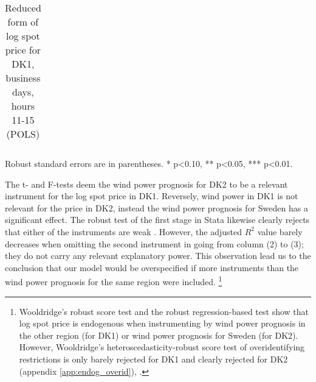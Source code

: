 \begin{table}[H]
\begin{threeparttable}
  \centering
  \caption{Reduced form of log spot price for DK1, business days, hours 11-15 (POLS)}
  \label{tab:reduced_form_price_dk1}
  \footnotesize
  \begin{tabular}{lcccc}
         
  \end{tabular}
    \begin{tablenotes}
        \item Robust standard errors are in parentheses. * p<0.10, ** p<0.05, *** p<0.01.
    \end{tablenotes}
\end{threeparttable}
\end{table}
The t- and F-tests deem the wind power prognosis for DK2 to be a relevant instrument for the log spot price in DK1. Reversely, wind power in DK1 is not relevant for the price in DK2, instead the wind power prognosis for Sweden has a significant effect. The robust test of the first stage in Stata likewise clearly rejects that either of the instruments are weak \citep{statacorp2017stata}. However, the adjusted $R^2$ value barely decreases when omitting the second instrument in going from column (2) to (3); they do not carry any relevant explanatory power. This observation lead us to the conclusion that our model would be overspecified if more instruments than the wind power prognosis for the same region were included. \footnote{Wooldridge's robust score test and the robust regression-based test show that log spot price is endogenous when instrumenting by wind power prognosis in the other region (for DK1) or wind power prognosis for Sweden (for DK2). However, Wooldridge's heteroscedasticity-robust score test of overidentifying restrictions is only barely rejected for DK1 and clearly rejected for DK2 (appendix \ref{app:endog_overid}), \citep{statacorp2017stata}.}

